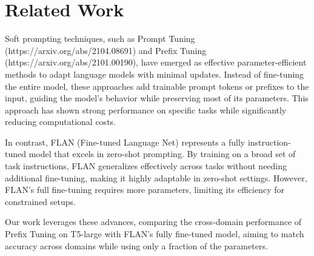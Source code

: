 \documentclass{article}
\begin{document}
\section{Related Work}
Soft prompting techniques, such as Prompt Tuning (https://arxiv.org/abs/2104.08691) and Prefix Tuning (https://arxiv.org/abs/2101.00190), have emerged as effective parameter-efficient methods to adapt language models with minimal updates. Instead of fine-tuning the entire model, these approaches add trainable prompt tokens or prefixes to the input, guiding the model's behavior while preserving most of its parameters. This approach has shown strong performance on specific tasks while significantly reducing computational costs.

In contrast, FLAN (Fine-tuned Language Net) represents a fully instruction-tuned model that excels in zero-shot prompting. By training on a broad set of task instructions, FLAN generalizes effectively across tasks without needing additional fine-tuning, making it highly adaptable in zero-shot settings. However, FLAN's full fine-tuning requires more parameters, limiting its efficiency for constrained setups.

Our work leverages these advances, comparing the cross-domain performance of Prefix Tuning on T5-large with FLAN's fully fine-tuned model, aiming to match accuracy across domains while using only a fraction of the parameters.



\end{document}
